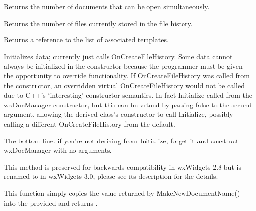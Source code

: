 \label{wxdocmanagergetmaxdocsopen}


Returns the number of documents that can be open simultaneously.


\label{wxdocmanagergethistoryfilescount}


Returns the number of files currently stored in the file history.


\label{wxdocmanagergettemplates}


Returns a reference to the list of associated templates.


\label{wxdocmanagerinitialize}


Initializes data; currently just calls OnCreateFileHistory. Some data cannot
always be initialized in the constructor because the programmer must be given
the opportunity to override functionality. If OnCreateFileHistory was called
from the constructor, an overridden virtual OnCreateFileHistory would not be
called due to C++'s `interesting' constructor semantics. In fact Initialize
 called from the wxDocManager constructor, but this can be
vetoed by passing false to the second argument, allowing the derived class's
constructor to call Initialize, possibly calling a different OnCreateFileHistory
from the default.

The bottom line: if you're not deriving from Initialize, forget it and
construct wxDocManager with no arguments.


\label{wxdocmanagermakedefaultname}


This method is preserved for backwards compatibility in wxWidgets 2.8 but is
renamed to  in
wxWidgets 3.0, please see its description for the details.

This function simply copies the value returned by MakeNewDocumentName() into
the provided  and returns \true.




